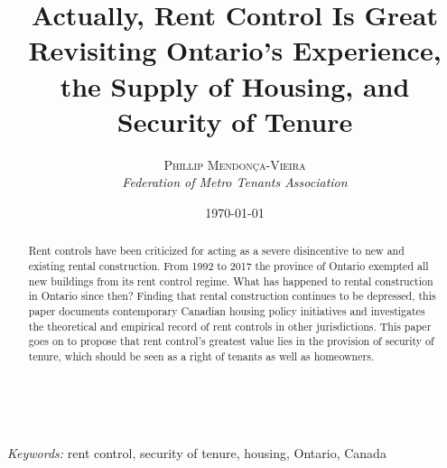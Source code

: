 \documentclass[letterpaper,12pt]{article} %
\title{\textsf{\textbf{Actually, Rent Control Is Great}\\ %
Revisiting Ontario's Experience, the Supply of Housing, and Security of Tenure}} %
\author{\textsc{Phillip Mendonça-Vieira} %
\\{\textit{Federation of Metro Tenants Association}}} %
\date{\today} %
\makeatletter
\renewcommand{\maketitle}{ %
\begin{flushright} %
{\LARGE\@title} %

\vspace{50pt} %

{\large\@author} %
\\\@date %

\vspace{40pt} %
\end{flushright}
}
\makeatother
\begin{document}
\maketitle %


\renewcommand{\abstractname}{\sffamily{Abstract}} %


\begin{abstract}
  Rent controls have been criticized for acting as a severe disincentive to new and existing rental construction. From 1992 to 2017 the province of Ontario exempted all new buildings from its rent control regime. What has happened to rental construction in Ontario since then? Finding that rental construction continues to be depressed, this paper documents contemporary Canadian housing policy initiatives and investigates the theoretical and empirical record of rent controls in other jurisdictions. This paper goes on to propose that rent control's greatest value lies in the provision of security of tenure, which should be seen as a right of tenants as well as homeowners.
\end{abstract}

\hspace*{3,6mm}\textit{Keywords:} rent control, security of tenure, housing, Ontario, Canada %

\vspace{30pt} %

\end{document}
